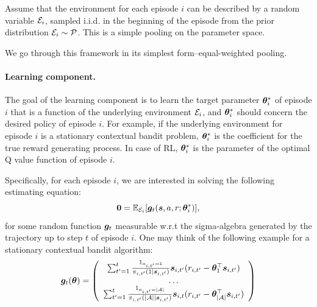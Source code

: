 \documentclass{article}
\newcommand{\sam}[1]{
  {\color{blue} [SAM: {#1}]}
 }
\begin{document}
Assume that the environment for each episode $i$ can be described by a random variable ${\mathcal{E}}_i$, sampled i.i.d. in the beginning of the episode from the prior distribution ${\mathcal{E}}_i \sim {\mathcal{P}}$. This is a simple pooling on the parameter space.


We go through this framework in its simplest form--equal-weighted pooling.

\paragraph{Learning component.} 

The goal of the learning component is to learn the target parameter ${\bm{\theta}}^*_i$ of episode $i$ that is a function of the underlying environment ${\mathcal{E}}_i$, and ${\bm{\theta}}^*_i$ should concern the desired policy of episode $i$. For example, if the underlying environment for episode $i$ is a stationary contextual bandit problem, ${\bm{\theta}}^*_i$ is the coefficient for the true reward generating process. 
In case of RL, ${\bm{\theta}}^*_i$ is the parameter of the optimal Q value function of episode $i$.

Specifically, for each episode $i$, we are interested in solving the following estimating equation:
$$
    \mathbf{0} = \mathbb{E}_{{\mathcal{E}}_i}[{\bm{g}}_t({\bm{s}}, a, r; {\bm{\theta}}^*_i)],
$$
for some random function ${\bm{g}}_t$ measurable w.r.t the sigma-algebra generated by the trajectory up to step $t$ of episode $i$. One may think of the following example for a stationary contextual bandit algorithm: 
$$
    {\bm{g}}_t({\bm{\theta}}) = 
    \left(\begin{array}{c}
         \sum_{t'=1}^{t}\frac{1_{a_{i, t'} = 1}}{\pi_{i, t'}(1 \mid {\bm{s}}_{i, t'})}{\bm{s}}_{i, t'} (r_{i, t'} - {\bm{\theta}}_{1}^{\top} {\bm{s}}_{i, t'})  \\
         \dots \\
         \sum_{t'=1}^t\frac{1_{a_{i, t'} = |{\mathcal{A}}|}}{\pi_{i, t'}(|{\mathcal{A}}| \mid {\bm{s}}_{i, t'})} {\bm{s}}_{i, t} (r_{i, t'} - {\bm{\theta}}_{|{\mathcal{A}}|}^{\top} {\bm{s}}_{i, t'})
    \end{array}\right)
$$
\end{document}
